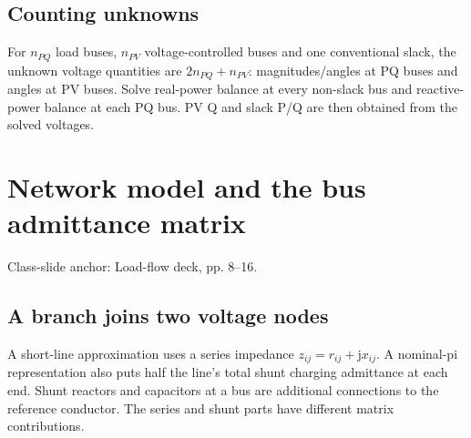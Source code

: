 \documentclass[11pt,a4paper]{article}
\newcommand{\slides}[1]{{\small\color{muted}\textsf{Class-slide anchor: #1.}}\par}
\newcommand{\chapterstart}[2]{\par\needspace{12\baselineskip}\section{#1}\label{#2}}
\newcommand{\jj}{\mathrm j}
\begin{document}
\subsection{Counting unknowns}
For $n_{PQ}$ load buses, $n_{PV}$ voltage-controlled buses and one conventional slack, the unknown voltage quantities are $2n_{PQ}+n_{PV}$: magnitudes/angles at PQ buses and angles at PV buses. Solve real-power balance at every non-slack bus and reactive-power balance at each PQ bus. PV Q and slack P/Q are then obtained from the solved voltages.

\chapterstart{Network model and the bus admittance matrix}{ybus}
\slides{Load-flow deck, pp. 8--16}
\subsection{A branch joins two voltage nodes}
A short-line approximation uses a series impedance $z_{ij}=r_{ij}+\jj x_{ij}$. A nominal-pi representation also puts half the line's total shunt charging admittance at each end. Shunt reactors and capacitors at a bus are additional connections to the reference conductor. The series and shunt parts have different matrix contributions.
\begin{center}\end{center}
\end{document}
